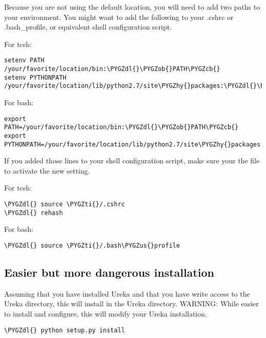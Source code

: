 \documentclass[letterpaper,10pt,english]{sphinxmanual}
\def\PYGZus{\char`\_}
\def\PYGZob{\char`\{}
\def\PYGZcb{\char`\}}
\def\PYGZdl{\char`\$}
\def\PYGZhy{\char`\-}
\def\PYGZti{\char`\~}
\begin{document}
Because you are not using the default location, you will need to add two paths to
your environment.  You might want to add the following to your .cshrc or .bash\_profile,
or equivalent shell configuration script.

For tcsh:

\begin{Verbatim}[commandchars=\\\{\}]
setenv PATH /your/favorite/location/bin:\PYGZdl{}\PYGZob{}PATH\PYGZcb{}
setenv PYTHONPATH /your/favorite/location/lib/python2.7/site\PYGZhy{}packages:\PYGZdl{}\PYGZob{}PYTHONPATH\PYGZcb{}
\end{Verbatim}

For bash:

\begin{Verbatim}[commandchars=\\\{\}]
export PATH=/your/favorite/location/bin:\PYGZdl{}\PYGZob{}PATH\PYGZcb{}
export PYTHONPATH=/your/favorite/location/lib/python2.7/site\PYGZhy{}packages:\PYGZdl{}\PYGZob{}PYTHONPATH\PYGZcb{}
\end{Verbatim}

If you added those lines to your shell configuration script, make sure your 
the file to activate the new setting.

For tcsh:

\begin{Verbatim}[commandchars=\\\{\}]
\PYGZdl{} source \PYGZti{}/.cshrc
\PYGZdl{} rehash
\end{Verbatim}

For bash:

\begin{Verbatim}[commandchars=\\\{\}]
\PYGZdl{} source \PYGZti{}/.bash\PYGZus{}profile
\end{Verbatim}


\subsection{Easier but more dangerous installation}
\label{intro:easier-but-more-dangerous-installation}
Assuming that you have installed Ureka and that you have write access to the Ureka
directory, this will install  in the Ureka  directory.
WARNING: While easier to install and configure, this will modify your Ureka
installation.

\begin{Verbatim}[commandchars=\\\{\}]
\PYGZdl{} python setup.py install
\end{Verbatim}
\end{document}
